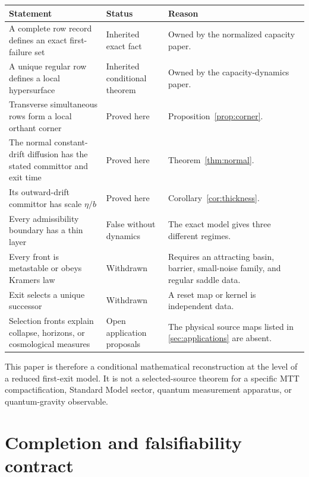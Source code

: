 \documentclass[11pt]{article}
\theoremstyle{definition}
\theoremstyle{remark}
\begin{document}
\begin{center}
\begin{tabularx}{\textwidth}{@{}L{0.27\textwidth}L{0.20\textwidth}Y@{}}
\toprule
Statement & Status & Reason \\
\midrule
A complete row record defines an exact first-failure set
& Inherited exact fact
& Owned by the normalized capacity paper.\\

A unique regular row defines a local hypersurface
& Inherited conditional theorem
& Owned by the capacity-dynamics paper.\\

Transverse simultaneous rows form a local orthant corner
& Proved here
& Proposition~\ref{prop:corner}.\\

The normal constant-drift diffusion has the stated committor and exit time
& Proved here
& Theorem~\ref{thm:normal}.\\

Its outward-drift committor has scale \(\eta/b\)
& Proved here
& Corollary~\ref{cor:thickness}.\\

Every admissibility boundary has a thin layer
& False without dynamics
& The exact model gives three different regimes.\\

Every front is metastable or obeys Kramers law
& Withdrawn
& Requires an attracting basin, barrier, small-noise family, and regular
  saddle data.\\

Exit selects a unique successor
& Withdrawn
& A reset map or kernel is independent data.\\

Selection fronts explain collapse, horizons, or cosmological measures
& Open application proposals
& The physical source maps listed in \cref{sec:applications} are absent.\\
\bottomrule
\end{tabularx}
\end{center}

This paper is therefore a conditional mathematical reconstruction at the
level of a reduced first-exit model.  It is not a selected-source theorem
for a specific MTT compactification, Standard Model sector, quantum
measurement apparatus, or quantum-gravity observable.

\section{Completion and falsifiability contract}
\label{sec:completion}
\end{document}
